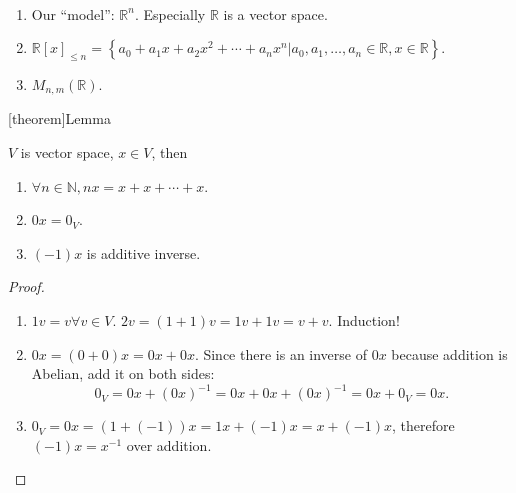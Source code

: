 \documentclass[12pt]{report}
\theoremstyle{definition}
\begin{document}
\begin{ex}
    \,

    \begin{enumerate}[label = (\arabic*)]
        \item Our ``model'': $\mathbb{R}^{n}$. Especially $\mathbb{R}$ is a vector space.

        \item 
            $\mathbb{R}{[x]}_{\le n} = \left\{a_0+ a_1x + a_2x^{2} + \cdots + a_n x^{n}
            |a_0, a_1,\ldots, a_n\in \mathbb{R}, x\in \mathbb{R}\right\} $.

        \item $M_{n,m}(\mathbb{R})$.
    \end{enumerate}
    
\end{ex}

[theorem]{Lemma}
\begin{vector space property}
    $V$ is vector space, $x \in V$, then
    \begin{enumerate}[label = (\arabic*)]
        \item $\forall n \in \mathbb{N}, nx = x + x + \cdots + x$.
        \item $0 x = 0_V$.
        \item $(-1)x$ is additive inverse.
    \end{enumerate}
\end{vector space property}

\begin{proof}
    \,

    \begin{enumerate}[label = (\arabic*)]
        \item $1v = v \forall v \in V$.
            $2v = (1 + 1)v = 1v + 1v = v + v$.
            Induction!

        \item $0x = (0 + 0)x = 0x + 0x$.
            Since there is an inverse of $0x$ because addition is Abelian,
            add it on both sides:\[
                0_V = 0x + {(0x)}^{-1} = 0x + 0x + {(0x)}^{-1} = 0x + 0_V = 0x.
            \]

        \item $0_V = 0x = (1 + (-1))x = 1x + (-1)x = x + (-1)x$, therefore
            $(-1)x = x^{-1}$ over addition.
    \end{enumerate}
\end{proof}
\end{document}
